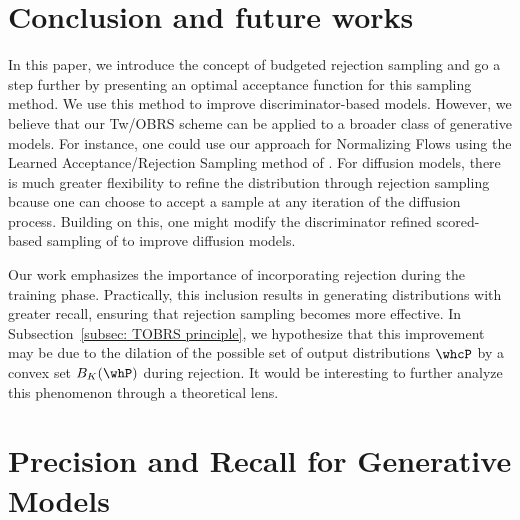 \documentclass[twoside]{article}
\begin{document}
\section{Conclusion and future works}
In this paper, we introduce the concept of budgeted rejection sampling and go a step further by presenting an optimal acceptance function for this sampling method. We use this method to improve discriminator-based models. However, we believe that our Tw/OBRS scheme can be applied to a broader class of generative models. For instance, one could use our approach for Normalizing Flows using the Learned Acceptance/Rejection  Sampling method of \cite{stimper_resampling_2022}. For diffusion models, there is much greater flexibility to refine the distribution through rejection sampling bcause one can choose to accept a sample at any iteration of the diffusion process. 
Building on this, one might modify the discriminator refined scored-based sampling of \cite{kim_refining_2023} to improve diffusion models.  

Our work emphasizes the importance of incorporating rejection during the training phase. Practically, this inclusion results in generating distributions with greater recall, ensuring that rejection sampling becomes more effective. 
In Subsection~\ref{subsec: TOBRS principle}, we hypothesize that this improvement may be due to the dilation of the possible set of output distributions
$\whcP$ by a convex set $B_K(\whP)$ during rejection. It would be interesting to further analyze this phenomenon through a theoretical lens. 






\clearpage{}



















\onecolumn
{}
\appendix
\section{Precision and Recall for Generative Models}\label{app:sec:PR}
\end{document}
